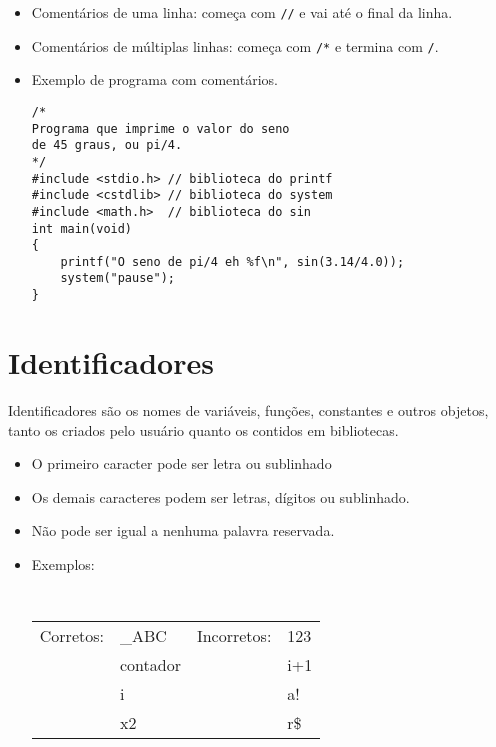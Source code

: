 \begin{itemize}

\item Comentários de uma linha: começa com {\tt //} e vai até o final da linha.
\item Comentários de múltiplas linhas: começa com {\tt /*} e termina com {\tt */}.

\item Exemplo de programa com comentários.

\begin{lstlisting}
/* 
Programa que imprime o valor do seno
de 45 graus, ou pi/4.
*/
#include <stdio.h> // biblioteca do printf
#include <cstdlib> // biblioteca do system
#include <math.h>  // biblioteca do sin
int main(void)
{
    printf("O seno de pi/4 eh %f\n", sin(3.14/4.0));
    system("pause");
}
\end{lstlisting}


\end{itemize}


\section{Identificadores}
\label{sec:ident}

Identificadores são os nomes de variáveis, funções, constantes e outros objetos, tanto os criados pelo usuário quanto os contidos em bibliotecas.

\begin{itemize}
\item O primeiro caracter pode ser letra ou sublinhado
\item Os demais caracteres podem ser letras, dígitos ou sublinhado.
\item Não pode ser igual a nenhuma palavra reservada.
\item Exemplos:

{\tt
\begin{tabular}{llll}
Corretos:           & \_ABC                 & Incorretos:     & 123       \\
                    & contador              &                 & i+1       \\
                    & i                     &                 & a!        \\
                    & x2                    &                 & r\$       \\
\end{tabular}
}

\end{itemize}


